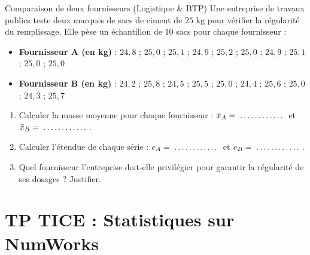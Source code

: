 \begin{exercice}[4 pts]{\capAnalyser}{Comparaison de deux fournisseurs (Logistique \& BTP)}
Une entreprise de travaux publics teste deux marques de sacs de ciment de $25\text{ kg}$ pour vérifier la régularité du remplissage. Elle pèse un échantillon de 10 sacs pour chaque fournisseur :
\begin{itemize}[leftmargin=1.5em, itemsep=1pt]
    \item \textbf{Fournisseur A (en kg)} : $24{,}8$ ; $25{,}0$ ; $25{,}1$ ; $24{,}9$ ; $25{,}2$ ; $25{,}0$ ; $24{,}9$ ; $25{,}1$ ; $25{,}0$ ; $25{,}0$
    \item \textbf{Fournisseur B (en kg)} : $24{,}2$ ; $25{,}8$ ; $24{,}5$ ; $25{,}5$ ; $25{,}0$ ; $24{,}4$ ; $25{,}6$ ; $25{,}0$ ; $24{,}3$ ; $25{,}7$
\end{itemize}

\begin{enumerate}[leftmargin=1.5em]
    \item Calculer la masse moyenne pour chaque fournisseur : $\bar{x}_A = \pointille[2cm]$ et $\bar{x}_B = \pointille[2cm]$.
    \item Calculer l'étendue de chaque série : $e_A = \pointille[2cm]$ et $e_B = \pointille[2cm]$.
    \item Quel fournisseur l'entreprise doit-elle privilégier pour garantir la régularité de ses dosages ? Justifier.
\end{enumerate}
\lignesreponse[4]
\end{exercice}

\section{TP TICE : Statistiques sur NumWorks}

